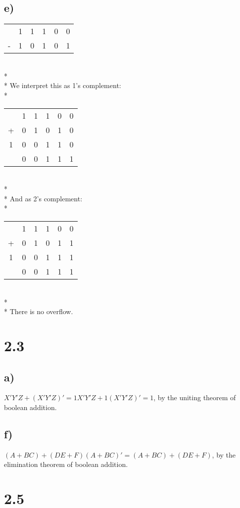 \documentclass{article}
\begin{document}
\subsection{e)}
\begin{tabular}{c@{\,}c@{\,}c@{\,}c@{\,}c@{\,}c}
  &1&1&1&0&0 \\
- &1&0&1&0&1 \\
\hline
\end{tabular}
\\*\\*
We interpret this as 1's complement:
\\*
\begin{tabular}{c@{\,}c@{\,}c@{\,}c@{\,}c@{\,}c}
  &1&1&1&0&0 \\
+ &0&1&0&1&0 \\
\hline
 1&0&0&1&1&0 \\
\hline
  &0&0&1&1&1 \\ 
\end{tabular}
\\*\\*
And as 2's complement:
\\*
\begin{tabular}{c@{\,}c@{\,}c@{\,}c@{\,}c@{\,}c}
  &1&1&1&0&0 \\
+ &0&1&0&1&1 \\
\hline
 1&0&0&1&1&1 \\
\hline
  &0&0&1&1&1 \\
\end{tabular}
\\*\\*
There is no overflow.


\section{2.3}
\subsection{a)}
$X'Y'Z + (X'Y'Z)' = 1X'Y'Z + 1(X'Y'Z)' = 1$, by the uniting theorem of boolean addition.
\subsection{f)}
$(A + BC) + (DE + F)(A + BC)' = (A + BC) + (DE + F)$, by the elimination theorem of boolean addition.


\section{2.5}
\end{document}
